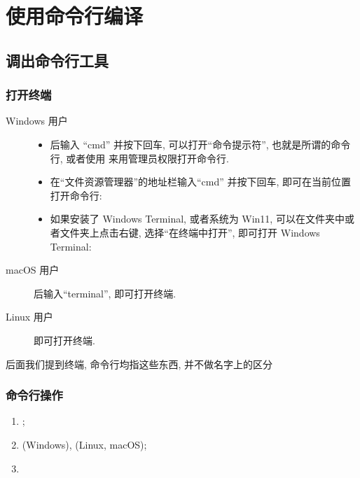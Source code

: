 \section{使用命令行编译}

\subsection{调出命令行工具}

\begin{frame}\frametitle{打开终端}
  \begin{description}
    \item[Windows 用户] 
    \begin{itemize}
      \item {} 后输入 ``cmd'' 并按下回车, 可以打开``命令提示符'', 也就是所谓的命令行, 或者使用 \keys{\ctrl + \shift + \enter} 来用管理员权限打开命令行.
      \item 在``文件资源管理器''的地址栏输入``cmd'' 并按下回车, 即可在当前位置打开命令行:
      \item 如果安装了 Windows Terminal, 或者系统为 Win11, 可以在文件夹中或者文件夹上点击右键, 选择``在终端中打开'', 即可打开 Windows Terminal:
    \end{itemize}
    \item[macOS 用户] \keys{\cmdmac + \SPACE} 后输入``terminal'', 即可打开终端. 
    \item[Linux 用户]  即可打开终端. 
  \end{description}
后面我们提到终端, 命令行均指这些东西, 并不做名字上的区分
\end{frame}


\begin{frame}[fragile]
  \frametitle{命令行操作}
  \begin{enumerate}
    \item {};
    \item {} (Windows),  (Linux, macOS);
    \item {}
  \end{enumerate}
\end{frame}


